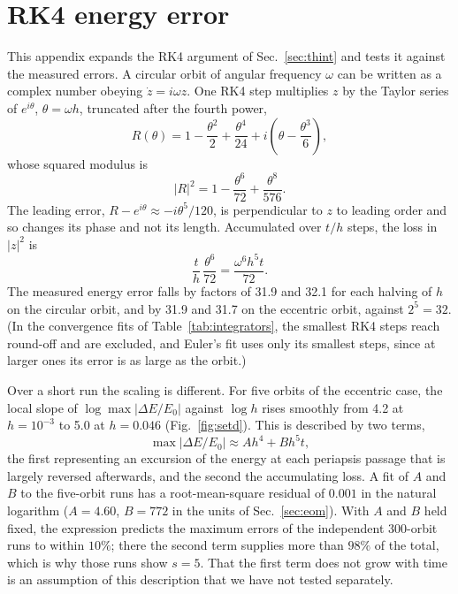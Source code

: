 \documentclass[a4paper,journal]{IEEEtran}
\begin{document}
\section{RK4 energy error}\label{app:rk4}

This appendix expands the RK4 argument of Sec.~\ref{sec:thint} and tests it against the measured errors. A circular orbit of angular frequency $\omega$ can be written as a complex number obeying $\dot z=i\omega z$. One RK4 step multiplies $z$ by the Taylor series of $e^{i\theta}$, $\theta=\omega h$, truncated after the fourth power,
\begin{equation}
R(\theta)=1-\frac{\theta^2}{2}+\frac{\theta^4}{24}+i\left(\theta-\frac{\theta^3}{6}\right),
\end{equation}
whose squared modulus is
\begin{equation}
|R|^2=1-\frac{\theta^6}{72}+\frac{\theta^8}{576}.
\end{equation}
The leading error, $R-e^{i\theta}\approx-i\theta^5/120$, is perpendicular to $z$ to leading order and so changes its phase and not its length. Accumulated over $t/h$ steps, the loss in $|z|^2$ is
\begin{equation}
\frac{t}{h}\,\frac{\theta^6}{72}=\frac{\omega^6h^5t}{72}.
\end{equation}
The measured energy error falls by factors of 31.9 and 32.1 for each halving of $h$ on the circular orbit, and by 31.9 and 31.7 on the eccentric orbit, against $2^5=32$. (In the convergence fits of Table~\ref{tab:integrators}, the smallest RK4 steps reach round-off and are excluded, and Euler's fit uses only its smallest steps, since at larger ones its error is as large as the orbit.)

Over a short run the scaling is different. For five orbits of the eccentric case, the local slope of $\log\max|\Delta E/E_0|$ against $\log h$ rises smoothly from 4.2 at $h=10^{-3}$ to 5.0 at $h=0.046$ (Fig.~\ref{fig:setd}). This is described by two terms,
\begin{equation}
\max|\Delta E/E_0|\approx Ah^4+Bh^5t,
\end{equation}
the first representing an excursion of the energy at each periapsis passage that is largely reversed afterwards, and the second the accumulating loss. A fit of $A$ and $B$ to the five-orbit runs has a root-mean-square residual of $0.001$ in the natural logarithm ($A=4.60$, $B=772$ in the units of Sec.~\ref{sec:eom}). With $A$ and $B$ held fixed, the expression predicts the maximum errors of the independent 300-orbit runs to within $10\%$; there the second term supplies more than $98\%$ of the total, which is why those runs show $s=5$. That the first term does not grow with time is an assumption of this description that we have not tested separately.
\end{document}
